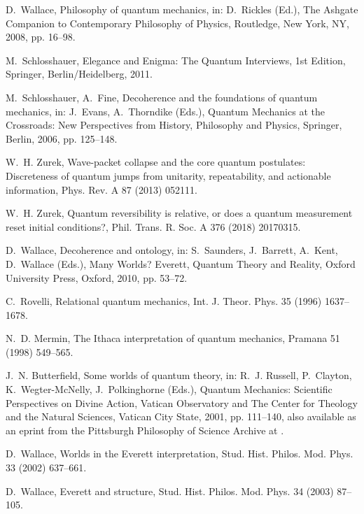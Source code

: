 \documentclass[3p,sort&compress]{elsarticle}
\begin{document}
\begin{thebibliography}{100}
D.~Wallace, Philosophy of quantum mechanics, in: D.~Rickles (Ed.), The Ashgate
  Companion to Contemporary Philosophy of Physics, Routledge, New York, NY,
  2008, pp. 16--98.

M.~Schlosshauer, Elegance and Enigma: The Quantum Interviews, 1st Edition,
  Springer, Berlin/Heidelberg, 2011.

M.~Schlosshauer, A.~Fine, Decoherence and the foundations of quantum mechanics,
  in: J.~Evans, A.~Thorndike (Eds.), Quantum Mechanics at the Crossroads: New
  Perspectives from History, Philosophy and Physics, Springer, Berlin, 2006,
  pp. 125--148.

W.~H. Zurek, Wave-packet collapse and the core quantum postulates:
  {D}iscreteness of quantum jumps from unitarity, repeatability, and actionable
  information, Phys. Rev. A 87 (2013) 052111.

W.~H. Zurek, Quantum reversibility is relative, or does a quantum measurement
  reset initial conditions?, Phil. Trans. R. Soc. A 376 (2018) 20170315.

D.~Wallace, Decoherence and ontology, in: S.~Saunders, J.~Barrett, A.~Kent,
  D.~Wallace (Eds.), Many Worlds? {E}verett, Quantum Theory and Reality, Oxford
  University Press, Oxford, 2010, pp. 53--72.

C.~Rovelli, Relational quantum mechanics, Int. J. Theor. Phys. 35 (1996)
  1637--1678.

N.~D. Mermin, The {I}thaca interpretation of quantum mechanics, Pramana 51
  (1998) 549--565.

J.~N. Butterfield, Some worlds of quantum theory, in: R.~J. Russell,
  P.~Clayton, K.~Wegter-McNelly, J.~Polkinghorne (Eds.), Quantum Mechanics:
  Scientific Perspectives on Divine Action, Vatican Observatory and The Center
  for Theology and the Natural Sciences, Vatican City State, 2001, pp.
  111--140, also available as an eprint from the Pittsburgh Philosophy of
  Science Archive at \href{http://philsci-archive.pitt.edu/archive/00000203}{}.

D.~Wallace, Worlds in the {E}verett interpretation, Stud. Hist. Philos. Mod.
  Phys. 33 (2002) 637--661.

D.~Wallace, Everett and structure, Stud. Hist. Philos. Mod. Phys. 34 (2003)
  87--105.


\end{thebibliography}
\end{document}
